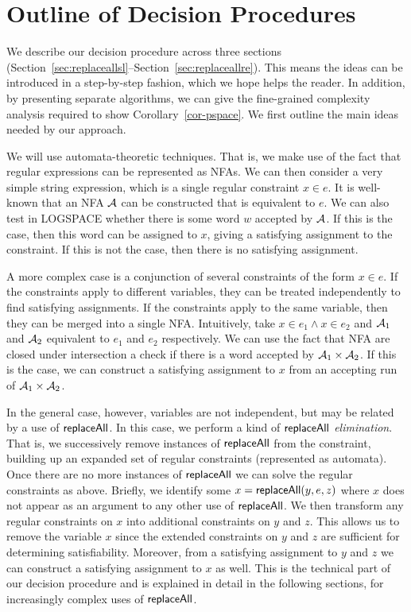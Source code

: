 
\section{Outline of Decision Procedures}

We describe our decision procedure across three sections (Section~\ref{sec:replaceallsl}--Section~\ref{sec:replaceallre}).
This means the ideas can be introduced in a step-by-step fashion, which we hope helps the reader.
In addition, by presenting separate algorithms, we can give the fine-grained complexity analysis required to show Corollary~\ref{cor-pspace}.
We first outline the main ideas needed by our approach.

We will use automata-theoretic techniques.
That is, we make use of the fact that regular expressions can be represented as NFAs.
We can then consider a very simple string expression, which is a single regular constraint $x \in e$.
It is well-known that an NFA $\mathcal{A}$ can be constructed that is equivalent to $e$.
We can also test in LOGSPACE whether there is some word $w$ accepted by $\mathcal{A}$.
If this is the case, then this word can be assigned to $x$, giving a satisfying assignment to the constraint.
If this is not the case, then there is no satisfying assignment.

A more complex case is a conjunction of several constraints of the form $x \in e$.
If the constraints apply to different variables, they can be treated independently to find satisfying assignments.
If the constraints apply to the same variable, then they can be merged into a single NFA.\@
Intuitively, take $x \in e_1 \land x \in e_2$ and $\mathcal{A}_1$ and $\mathcal{A}_2$ equivalent to $e_1$ and $e_2$ respectively.
We can use the fact that NFA are closed under intersection a check if there is a word accepted by $\mathcal{A}_1 \times \mathcal{A}_2$.
If this is the case, we can construct a satisfying assignment to $x$ from an accepting run of $\mathcal{A}_1 \times \mathcal{A}_2$.


In the general case, however, variables are not independent, but may be related by a use of $\mathsf{replaceAll}$.
In this case, we perform a kind of \emph{$\mathsf{replaceAll}$ elimination}.
That is, we successively remove instances of $\mathsf{replaceAll}$ from the constraint, building up an expanded set of regular constraints (represented as automata).
Once there are no more instances of $\mathsf{replaceAll}$ we can solve the regular constraints as above.
Briefly, we identify some $x = \mathsf{replaceAll}(y, e, z)$ where $x$ does not appear as an argument to any other use of $\mathsf{replaceAll}$.
We then transform any regular constraints on $x$ into additional constraints on $y$ and $z$.
This allows us to remove the variable $x$ since the extended constraints on $y$ and $z$ are sufficient for determining satisfiability.
Moreover, from a satisfying assignment to $y$ and $z$ we can construct a satisfying assignment to $x$ as well.
This is the technical part of our decision procedure and is explained in detail in the following sections, for increasingly complex uses of $\mathsf{replaceAll}$.



